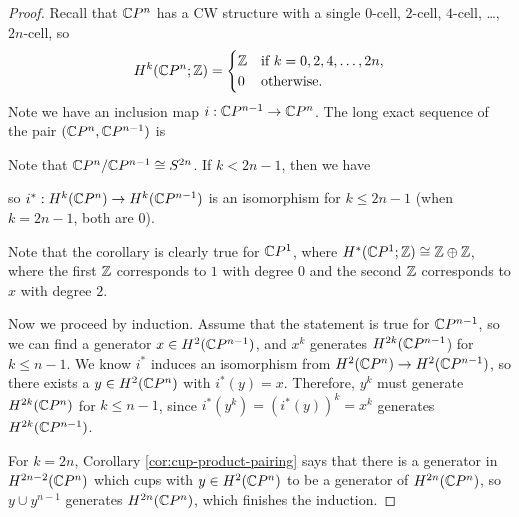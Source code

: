 \begin{proof}
  Recall that $\mathbb{C} P^n$ has a CW structure with
  a single $0$-cell, $2$-cell, $4$-cell, \dots,
  $2n$-cell, so
  \[
    H^k(\mathbb{C} P^n; \mathbb{Z}) =
    \begin{cases}
      \mathbb{Z} & \text{if $k = 0, 2, 4, \dots, 2n$}, \\
      0 & \text{otherwise}.
    \end{cases}
  \]
  Note we have an inclusion map
  $i : \mathbb{C} P^{n - 1} \to \mathbb{C} P^n$. The
  long exact sequence of the pair
  $(\mathbb{C} P^n, \mathbb{C} P^{n - 1})$ is
  \begin{center}
  \end{center}
  Note that $\mathbb{C} P^n / \mathbb{C} P^{n - 1} \cong S^{2n}$.
  If $k < 2n - 1$, then we have
  \begin{center}
  \end{center}
  so $i^* : H^k(\mathbb{C} P^n) \to H^k(\mathbb{C} P^{n - 1})$
  is an isomorphism for $k \le 2n - 1$ (when
  $k = 2n - 1$, both are $0$).

  Note that the corollary is clearly
  true for $\mathbb{C} P^1$, where
  $H^*(\mathbb{C} P^1; \mathbb{Z}) \cong \mathbb{Z} \oplus \mathbb{Z}$, where
  the first $\mathbb{Z}$ corresponds to $1$ with
  degree $0$ and the second $\mathbb{Z}$ corresponds
  to $x$ with degree $2$.

  Now we proceed by induction. Assume
  that the statement is true for $\mathbb{C} P^{n - 1}$,
  so we can find a generator $x \in H^2(\mathbb{C} P^{n - 1})$,
  and $x^k$ generates $H^{2k}(\mathbb{C} P^{n - 1}$)
  for $k \le n - 1$. We know
  $i^*$ induces an isomorphism from
  $H^2(\mathbb{C} P^n) \to H^2(\mathbb{C} P^{n - 1})$,
  so there exists a $y \in H^2(\mathbb{C} P^n)$ with
  $i^*(y) = x$. Therefore, $y^k$ must
  generate $H^{2k}(\mathbb{C} P^n)$ for $k \le n - 1$,
  since $i^*(y^k) = (i^*(y))^k = x^k$
  generates $H^{2k}(\mathbb{C} P^{n - 1})$.

  For $k = 2n$,
  Corollary \ref{cor:cup-product-pairing}
  says that there is a generator in
  $H^{2n - 2}(\mathbb{C} P^n)$ which cups with
  $y \in H^2(\mathbb{C} P^n)$ to be a generator of
  $H^{2n}(\mathbb{C} P^n)$, so $y \cup y^{n - 1}$
  generates $H^{2n}(\mathbb{C} P^n)$, which
  finishes the induction.
\end{proof}

